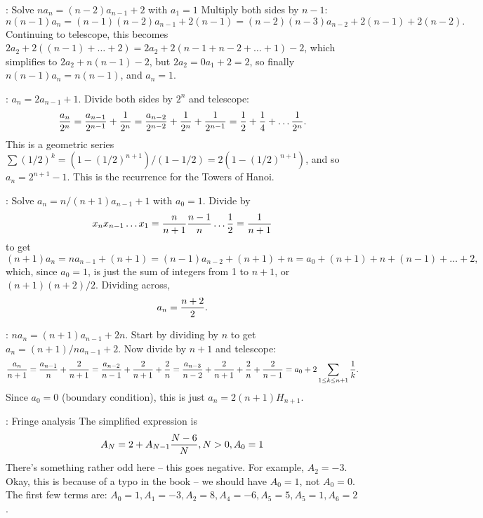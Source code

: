 \vskip 0.08in : Solve $n a_n = \left(n - 2\right) a_{n-1} + 2$
with $a_1 = 1$\hfil\break
Multiply both sides by $n-1$: 
$$
n \left(n - 1\right) a_n = 
\left(n - 1 \right) \left(n - 2\right) a_{n-1} + 2 \left(n - 1\right) =
\left(n - 2 \right) \left(n - 3\right) a_{n-2} + 2 \left(n - 1\right) + 2 \left(n - 2\right).
$$
Continuing to telescope, this becomes $2 a_2 + 2 \left(\left(n - 1\right) + \ldots + 2\right)
= 2 a_2 + 2 \left(n - 1 + n - 2 + \ldots + 1\right) - 2$, which simplifies to
$2 a_2 + n \left(n - 1\right) - 2$, but $2 a_2 = 0 a_1 + 2 = 2$, so finally
$n \left(n - 1\right) a_n = n \left(n - 1\right)$, and $a_n = 1$.

\vskip 0.08in : $a_n = 2 a_{n-1} + 1$.\hfil\break
Divide both sides by $2^n$ and telescope:
$$
{a_n \over 2^n} = {a_{n-1} \over 2^{n-1}} + {1 \over 2^n} =
{a_{n-2} \over 2^{n-2}} + {1 \over 2^n} + {1 \over 2^{n-1}} = {1 \over 2}
+ {1 \over 4} + \ldots {1 \over 2^n}.
$$
This is a geometric series $\sum \left(1/2\right)^k = \left(1 - \left(1/2\right)^{n+1}\right) /
\left(1 - 1/2\right) = 2 \left(1 - \left(1 / 2\right)^{n+1}\right)$, and so
$a_n = 2^{n+1} - 1$.  This is the recurrence for the Towers of Hanoi.

\vskip 0.08in : Solve $a_n = n / \left(n+1\right) a_{n-1} + 1$ with 
$a_0 = 1$.\hfil\break
Divide by 
$$
 x_n x_{n-1} \ldots x_1 = {n \over n + 1} {n - 1 \over n} \ldots {1 \over 2} = {1 \over n + 1}
$$
to get
$$
 \left(n + 1\right) a_n = n a_{n-1} + \left(n + 1\right)
  = \left(n - 1\right) a_{n-2} + \left(n + 1\right) + n = a_0 + \left(n+1\right) + n +
  \left(n - 1\right) + \ldots + 2,
$$
which, since $a_0 = 1$, is just the sum of integers from 1 to $n+1$, or
$\left(n + 1\right)\left(n + 2\right) / 2$.  Dividing across,
$$ 
 a_n = {n + 2 \over 2}.
$$

\vskip 0.08in : $n a_n = \left(n + 1\right) a_{n-1} + 2 n$.
\hfil\break Start by dividing by $n$ to get $a_n = \left(n + 1\right) / n a_{n-1} + 2$.
Now divide by $n+1$ and telescope:
$$
 {a_n \over n + 1} = {a_{n-1} \over n} + {2 \over n + 1} =
 {a_{n-2} \over n - 1} + {2 \over n + 1} + {2 \over n} =
 {a_{n-3} \over n - 2} + {2 \over n + 1} + {2 \over n} + {2 \over n - 1} =
 a_0 + 2 \sum_{1 \le k \le n + 1} {1 \over k}.
$$
Since $a_0 = 0$ (boundary condition), this is just $a_n = 2 \left(n + 1\right) H_{n + 1}$.

\vskip 0.08in : Fringe analysis\hfil\break
The simplified expression is
$$
 A_N = 2 + A_{N-1} {N - 6 \over N}, N > 0, A_0 = 1
$$
There's something rather odd here -- this goes negative.  For example,
$A_2 = -3$.   Okay, this is because of a typo in the book -- we should have
$A_0 = 1$, not $A_0 = 0$.  The first few terms are:
$A_0 = 1, A_1 = -3, A_2 =  8, A_4=-6, A_5=5, A_5 = 1, A_6 = 2$.

